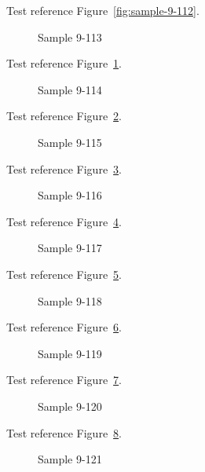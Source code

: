 Test reference Figure~\ref{fig:sample-9-112}.

\begin{figure}[tbhp]
\caption{Sample 9-113}
\label{fig:sample-9-113}
\end{figure}

Test reference Figure~\ref{fig:sample-9-113}.

\begin{figure}[tbhp]
\caption{Sample 9-114}
\label{fig:sample-9-114}
\end{figure}

Test reference Figure~\ref{fig:sample-9-114}.

\begin{figure}[tbhp]
\caption{Sample 9-115}
\label{fig:sample-9-115}
\end{figure}

Test reference Figure~\ref{fig:sample-9-115}.

\begin{figure}[tbhp]
\caption{Sample 9-116}
\label{fig:sample-9-116}
\end{figure}

Test reference Figure~\ref{fig:sample-9-116}.

\begin{figure}[tbhp]
\caption{Sample 9-117}
\label{fig:sample-9-117}
\end{figure}

Test reference Figure~\ref{fig:sample-9-117}.

\begin{figure}[tbhp]
\caption{Sample 9-118}
\label{fig:sample-9-118}
\end{figure}

Test reference Figure~\ref{fig:sample-9-118}.

\begin{figure}[tbhp]
\caption{Sample 9-119}
\label{fig:sample-9-119}
\end{figure}

Test reference Figure~\ref{fig:sample-9-119}.

\begin{figure}[tbhp]
\caption{Sample 9-120}
\label{fig:sample-9-120}
\end{figure}

Test reference Figure~\ref{fig:sample-9-120}.

\begin{figure}[tbhp]
\caption{Sample 9-121}
\label{fig:sample-9-121}
\end{figure}

